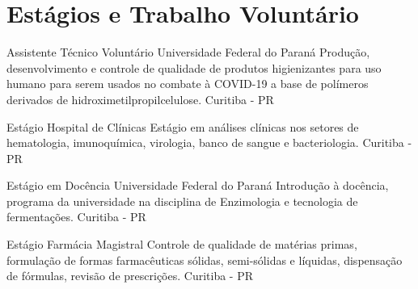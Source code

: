 \section{Estágios e Trabalho Voluntário}

{Assistente Técnico Voluntário}
{Universidade Federal do Paraná}
{
    Produção, desenvolvimento e controle de qualidade de produtos higienizantes 
    para uso humano para serem usados no combate à COVID-19 
    a base de polímeros derivados de  hidroximetilpropilcelulose.
}
{Curitiba - PR}

{Estágio}
{Hospital de Clínicas}
{
Estágio em análises clínicas nos setores de hematologia, 
imunoquímica, virologia, banco de sangue e bacteriologia.
}
{Curitiba - PR}

{Estágio em Docência}
{Universidade Federal do Paraná}
{
Introdução à docência, programa da universidade 
na disciplina de Enzimologia e tecnologia de fermentações.
}
{Curitiba - PR}

{Estágio}
{Farmácia Magistral}
{
Controle de qualidade de matérias primas, 
formulação de formas farmacêuticas sólidas, 
semi-sólidas e líquidas, dispensação de fórmulas, 
revisão de prescrições.
}
{Curitiba - PR}

